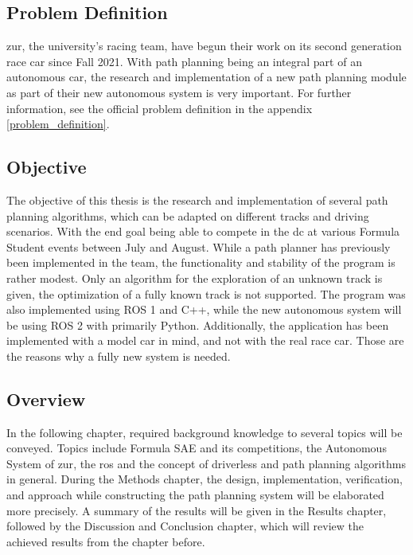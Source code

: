\subsection{Problem Definition} \label{sec:Problem Definition}
\acrlong{zur}, the university's racing team, have begun their work on its second generation race car since Fall 2021. With path planning being an integral part of an autonomous car, the research and implementation of a new path planning module as part of their new autonomous system is very important. For further information, see the official problem definition in the appendix \ref{problem_definition}.

\subsection{Objective} \label{sec:Objective}
The objective of this thesis is the research and implementation of several path planning algorithms, which can be adapted on different tracks and driving scenarios. With the end goal being able to compete in the \acrlong{dc} at various Formula Student events between July and August. While a path planner has previously been implemented in the team, the functionality and stability of the program is rather modest. Only an algorithm for the exploration of an unknown track is given, the optimization of a fully known track is not supported. The program was also implemented using ROS 1 and C++, while the new autonomous system will be using ROS 2 with primarily Python. Additionally, the application has been implemented with a model car in mind, and not with the real race car. Those are the reasons why a fully new system is needed.

\subsection{Overview} \label{sec:Overview}
In the following chapter, required background knowledge to several topics will be conveyed. Topics include Formula SAE and its competitions, the Autonomous System of \acrlong{zur}, the \acrlong{ros} and the concept of driverless and path planning algorithms in general. During the Methods chapter, the design, implementation, verification, and approach while constructing the path planning system will be elaborated more precisely. A summary of the results will be given in the Results chapter, followed by the Discussion and Conclusion chapter, which will review the achieved results from the chapter before.
